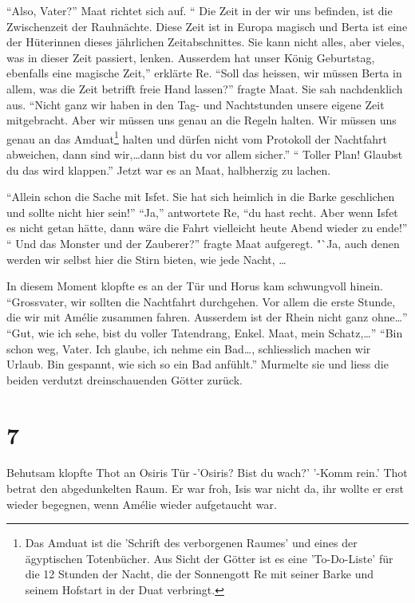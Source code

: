 \documentclass[11pt,titlepage,a5paper]{book}
\begin{document}
 "`Also, Vater?"' Maat richtet sich auf. "` Die Zeit in der wir uns befinden, ist die Zwischenzeit der Rauhnächte. Diese Zeit ist in Europa magisch und Berta ist eine der Hüterinnen dieses jährlichen Zeitabschnittes. Sie kann nicht alles, aber vieles, was in dieser Zeit passiert, lenken. Ausserdem hat unser König Geburtstag, ebenfalls eine magische Zeit,"' erklärte Re. "`Soll das heissen, wir müssen Berta in allem, was die Zeit betrifft freie Hand lassen?"' fragte Maat. Sie sah nachdenklich aus. "`Nicht ganz wir haben in den Tag- und Nachtstunden unsere eigene Zeit mitgebracht. Aber wir müssen uns genau an die Regeln halten. Wir müssen uns genau an das Amduat\footnote{Das Amduat ist die 'Schrift des verborgenen Raumes' und eines der ägyptischen Totenbücher. Aus Sicht der Götter ist es eine 'To-Do-Liste' für die 12 Stunden der Nacht, die der Sonnengott Re mit seiner Barke und seinem Hofstart in der Duat verbringt.} halten und dürfen nicht vom Protokoll der Nachtfahrt abweichen, dann sind wir,\dots dann bist du vor allem sicher."' "` Toller Plan! Glaubst du das wird klappen."' Jetzt war es an Maat, halbherzig zu lachen.
 
  "`Allein schon die Sache mit Isfet. Sie hat sich heimlich in die Barke geschlichen und sollte nicht hier sein!"' "`Ja,"' antwortete Re, "`du hast recht. Aber wenn Isfet es nicht getan hätte, dann wäre die Fahrt vielleicht heute Abend wieder zu ende!"' "` Und das Monster und der Zauberer?"' fragte Maat aufgeregt. "`Ja, auch denen werden wir selbst hier die Stirn bieten, wie jede Nacht, \dots

In diesem Moment klopfte es an der Tür und Horus kam schwungvoll hinein. "`Grossvater, wir sollten die Nachtfahrt durchgehen. Vor allem die erste Stunde, die wir mit Amélie zusammen fahren. Ausserdem ist der Rhein nicht ganz ohne\dots"' "`Gut, wie ich sehe, bist du voller Tatendrang, Enkel.  Maat, mein Schatz,\dots"' "`Bin schon weg, Vater. Ich glaube, ich nehme ein Bad\dots, schliesslich machen wir Urlaub. Bin gespannt, wie sich so ein Bad anfühlt."' Murmelte sie und liess die beiden verdutzt dreinschauenden Götter zurück. 

\section*{7}


Behutsam klopfte Thot an Osiris Tür -'Osiris? Bist du wach?' '-Komm rein.' Thot betrat den abgedunkelten Raum. Er war froh, Isis war nicht da, ihr wollte er erst wieder begegnen, wenn Amélie wieder aufgetaucht war.
\end{document}
